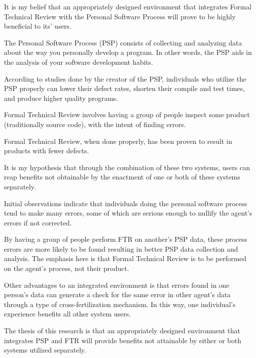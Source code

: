 \documentclass{article}
\begin{document}
It is my belief that an appropriately designed environment that integrates
Formal Technical Review with the Personal Software Process will prove to be
highly beneficial to its' users.

The Personal Software Process (PSP) consists of collecting and analyzing
data about the way you personally develop a program.  In other words, the
PSP aids in the analysis of your software development habits.

According to studies done by the creator of the PSP, individuals who
utilize the PSP properly can lower their defect rates, shorten their
compile and test times, and produce higher quality programs.

Formal Technical Review involves having a group of people inspect some
product (traditionally source code), with the intent of finding errors.

Formal Technical Review, when done properly, has been proven to result in
products with fewer defects.

It is my hypothesis that through the combination of these two systems,
users can reap benefits not obtainable by the enactment of one or both of
these systems separately.

Initial observations indicate that individuals doing the personal software process
tend to make many errors, some of which are serious enough to nullify the
agent's errors if not corrected.

By having a group of people perform FTR on another's PSP data, these
process errors are more likely to be found resulting in better PSP data
collection and analysis.  The emphasis here is that Formal Technical Review
is to be performed on the agent's process, not their product.

Other advantages to an integrated environment is that errors found in one
person's data can generate a check for the same error in other agent's data
through a type of cross-fertilization mechanism.  In this way, one
individual's experience benefits all other system users.

The thesis of this research is that an appropriately designed environment
that integrates PSP and FTR will provide benefits not attainable by either
or both systems utilized separately.
\end{document}
